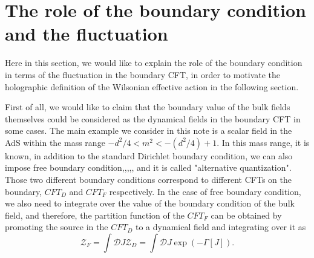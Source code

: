 \documentclass[12pt,epsbox]{article}
\numberwithin{equation}{section}
\begin{document}

\section{The role of the boundary condition and the fluctuation}

Here in this section, we would like to explain the role of the boundary condition in terms of the fluctuation in the boundary CFT, in order to motivate the holographic definition of the Wilsonian effective action in the following section.

First of all, we would like to claim that the boundary value of the bulk fields themselves could be considered as the dynamical fields in the boundary CFT in some cases. The main example we consider in this note is a scalar field in the AdS within the mass range $-d^2/4 < m^2 < -(d^2/4)+1$.
In this mass range, it is known, in addition to the standard Dirichlet boundary condition, we can also impose free boundary condition\cite{Witten2},\cite{Muck},\cite{Witten},\cite{WittenNeumann},\cite{MukundHRG}, and it is called "alternative quantization". Those two different boundary conditions correspond to different CFTs on the boundary, $CFT_D$ and $CFT_F$ respectively. In the case of free boundary condition, we also need to integrate over the value of the boundary condition of the bulk field, and therefore, the partition function of the $CFT_F$ can be obtained by promoting the source in the $CFT_D$ to a dynamical field and integrating over it as
\begin{equation}
\mathcal{Z}_F =\int \mathcal{D}J \mathcal{Z}_D = \int \mathcal{D}J \exp(-\Gamma[J])\label{FD}.
\end{equation}
\end{document}
